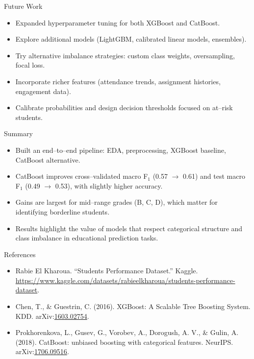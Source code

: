 \documentclass[aspectratio=169]{beamer}
\begin{document}
\begin{frame}{Future Work}
  \begin{itemize}
    \item Expanded hyperparameter tuning for both XGBoost and CatBoost.
    \item Explore additional models (LightGBM, calibrated linear models, ensembles).
    \item Try alternative imbalance strategies: custom class weights, oversampling, focal loss.
    \item Incorporate richer features (attendance trends, assignment histories, engagement data).
    \item Calibrate probabilities and design decision thresholds focused on at--risk students.
  \end{itemize}
\end{frame}

\begin{frame}{Summary}
  \begin{itemize}
    \item Built an end--to--end pipeline: EDA, preprocessing, XGBoost baseline, CatBoost alternative.
    \item CatBoost improves cross--validated macro F$_1$ (0.57 $\rightarrow$ 0.61) and test macro F$_1$ (0.49 $\rightarrow$ 0.53), with slightly higher accuracy.
    \item Gains are largest for mid--range grades (B, C, D), which matter for identifying borderline students.
    \item Results highlight the value of models that respect categorical structure and class imbalance in educational prediction tasks.
  \end{itemize}
\end{frame}

\begin{frame}{References}
  \begin{itemize}
    \item Rabie El Kharoua. ``Students Performance Dataset.'' Kaggle. \url{https://www.kaggle.com/datasets/rabieelkharoua/students-performance-dataset}.
    \item Chen, T., \& Guestrin, C. (2016). XGBoost: A Scalable Tree Boosting System. KDD. arXiv:\href{https://arxiv.org/abs/1603.02754}{1603.02754}.
    \item Prokhorenkova, L., Gusev, G., Vorobev, A., Dorogush, A. V., \& Gulin, A. (2018). CatBoost: unbiased boosting with categorical features. NeurIPS. arXiv:\href{https://arxiv.org/abs/1706.09516}{1706.09516}.
  \end{itemize}
\end{frame}
\end{document}

